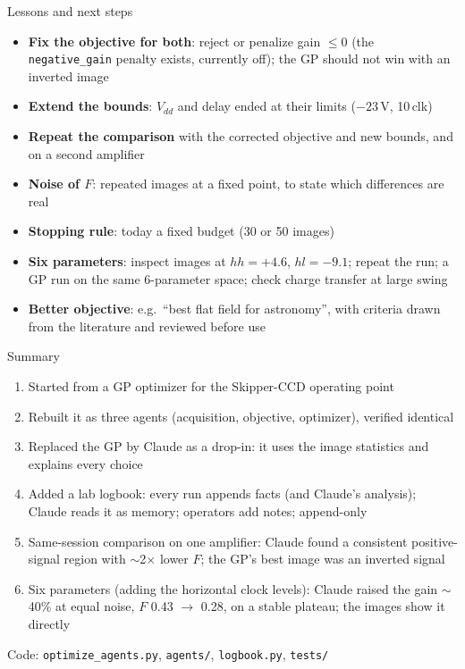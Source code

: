 \documentclass[aspectratio=169,10pt]{beamer}
\begin{document}
\begin{frame}{Lessons and next steps}
  \begin{itemize}
    \item \textbf{Fix the objective for both}: reject or penalize gain $\le 0$ (the
          \texttt{negative\_gain} penalty exists, currently off); the GP should not win with
          an inverted image
    \item \textbf{Extend the bounds}: $V_{dd}$ and delay ended at their limits ($-23$\,V, 10\,clk)
    \item \textbf{Repeat the comparison} with the corrected objective and new bounds, and on a
          second amplifier
    \item \textbf{Noise of $F$}: repeated images at a fixed point, to state which differences
          are real
    \item \textbf{Stopping rule}: today a fixed budget (30 or 50 images)
    \item \textbf{Six parameters}: inspect images at $hh=+4.6$, $hl=-9.1$; repeat the run;
          a GP run on the same 6-parameter space; check charge transfer at large swing
    \item \textbf{Better objective}: e.g.\ ``best flat field for astronomy'', with criteria drawn
          from the literature and reviewed before use
  \end{itemize}
\end{frame}

\begin{frame}{Summary}
  \begin{enumerate}
    \item Started from a GP optimizer for the Skipper-CCD operating point
    \item Rebuilt it as three agents (acquisition, objective, optimizer), verified identical
    \item Replaced the GP by Claude as a drop-in: it uses the image statistics and explains
          every choice
    \item Added a lab logbook: every run appends facts (and Claude's analysis); Claude reads it
          as memory; operators add notes; append-only
    \item Same-session comparison on one amplifier: Claude found a consistent positive-signal
          region with $\sim$2$\times$ lower $F$; the GP's best image was an inverted signal
    \item Six parameters (adding the horizontal clock levels): Claude raised the gain
          $\sim$40\% at equal noise, $F$ 0.43 $\to$ 0.28, on a stable plateau; the images
          show it directly
  \end{enumerate}
  \vspace{3mm}
  \centering
  {\small Code: \texttt{optimize\_agents.py}, \texttt{agents/}, \texttt{logbook.py}, \texttt{tests/}}
\end{frame}
\end{document}
